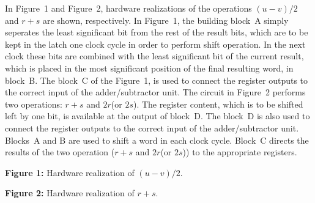 \documentclass[twocolumn]{IEEEtran}
\begin{document}
In Figure~1 and Figure~2, hardware realizations of the operations $(u-v)/2$ 
and $r+s$ are shown, respectively. In Figure~1, the building block~A simply 
seperates the least significant bit from the rest of the result bits, which are 
to be kept in the latch one clock cycle in order to perform shift operation.
In the next clock these bits are combined with the least significant bit of 
the current result, which is placed in the most significant position of the 
final resulting word, in block~B. The block~C of the Figure~1, is used to 
connect the register outputs to the correct input of the adder/subtractor unit.
The circuit in Figure~2 performs 
two operations: $r+s$ and $2r$(or $2s$). The register content, which is to be
shifted left by one bit, is available at the output of block~D. The block~D
is also used to connect the register outputs to the correct input of the 
adder/subtractor unit. Blocks~A and B are used to shift a word in each 
clock cycle. Block~C directs the results of the two operation 
($r+s$ and $2r$(or $2s$)) to the appropriate registers. 

\bigskip
\bigskip

\centerline{\textbf{Figure 1:} Hardware realization of $(u-v)/2$.}
\medskip
\epsfxsize=3.1in
\centerline{}

\bigskip
\bigskip

\centerline{\textbf{Figure 2:} Hardware realization of $r+s$.}
\medskip
\epsfxsize=3.1in
\centerline{}



\end{document}
